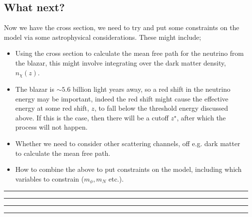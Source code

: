 \documentclass[10pt]{article}
\begin{document}
\subsection{What next?}
Now we have the cross section, we need to try and put some constraints on the model via some astrophysical considerations. These might include;
\begin{itemize}
\item Using the cross section to calculate the mean free path for the neutrino from the blazar, this might involve integrating over the dark matter density, $n_\chi(z)$.
\item The blazar is $\sim 5.6$ billion light years away, so a red shift in the neutrino energy may be important, indeed the red shift might cause the effective energy at some red shift, $z$, to fall below the threshold energy discussed above. If this is the case, then there will be a cutoff $z^\star$, after which the process will not happen.
\item Whether we need to consider other scattering channels, off e.g. dark matter to calculate the mean free path.
\item How to combine the above to put constraints on the model, including which variables to constrain ($m_\phi, m_N$ etc.).
\end{itemize}









\hrule
\vspace{1pt}
\hrule
\nocite{*}

\vspace{15pt}
\hrule
\vspace{1pt}
\hrule
\end{document}
